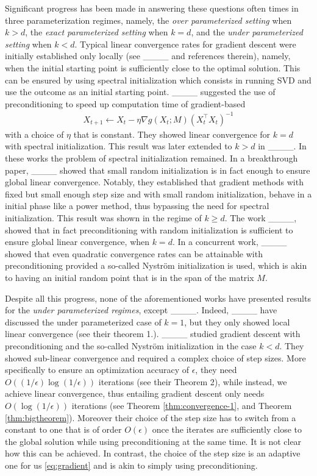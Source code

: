 Significant progress has been made in answering these questions often times in three parameterization regimes, namely, the \emph{over parameterized setting} when $k > d$, the \emph{exact parameterized setting} when $k = d$, and the \emph{under parameterized setting} when $k < d$. Typical linear convergence rates for gradient descent were initially established only locally (see ____ and references therein), namely, when the initial starting point is sufficiently close to the optimal solution. This can be ensured by using spectral initialization which consists in running SVD and use the outcome as an initial starting point. ____ suggested the use of preconditioning to speed up computation time of gradient-based 
\begin{align}
        X_{t+1} \gets X_t - \eta \nabla g(X_t; M) (X_t^\top X_t)^{-1}
\end{align}
with a choice of $\eta$ that is constant. They showed linear convergence for $k = d$ with spectral initialization. This result was later extended to $k > d$ in ____. In these works the problem of spectral initialization remained. In a breakthrough paper, ____ showed that small random initialization is in fact enough to ensure global linear convergence. Notably, they established that gradient methods with fixed but small enough step size and with small random initialization, behave in a initial phase like a power method, thus bypassing the need for spectral initialization. This result was shown in the regime of $k \ge d$. The work ____, showed that in fact preconditioning with random initialization is sufficient to ensure global linear convergence, when $k = d$. In a concurrent work, ____  showed that even quadratic convergence rates can be attainable with preconditioning provided a so-called Nyström initialization is used, which is akin to having an initial random point that is in the span of the matrix $M$. 

Despite all this progress, none of the aforementioned works have presented results for the \emph{under parameterized regimes}, except ____. Indeed, ____ have discussed the under parameterized case of $k = 1$, but they only showed local linear convergence (see their theorem 1.). ____ studied gradient descent with preconditioning and the so-called Nyström initialization in the case $k < d$. They showed sub-linear convergence and required a complex choice of step sizes. More specifically to ensure an optimization accuracy of $\epsilon$, they need $O((1/\epsilon)\log(1/\epsilon))$ iterations (see their Theorem 2), while instead, we achieve linear convergence, thus entailing gradient descent only needs $O(\log(1/\epsilon))$ iterations (see Theorem \ref{thm:convergence-1}, and Theorem \ref{thm:bigtheorem}). Moreover their choice of the step size has to switch from a constant to one that is of order $O(\epsilon)$ once the iterates are sufficiently close to the global solution while using preconditioning at the same time. It is not clear how this can be achieved. In contrast, the choice of the step size is an adaptive one for us \eqref{eq:gradient} and is akin to simply using preconditioning.


